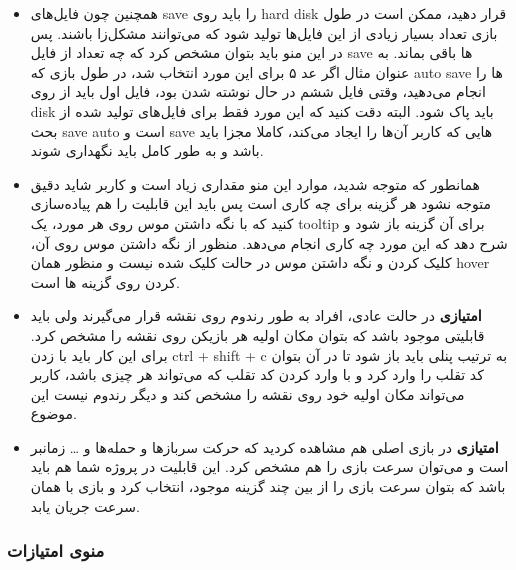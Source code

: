 \documentclass[]{article}
\begin{document}
\begin{itemize}
\item همچنین چون فایل‌های save را باید روی hard disk قرار دهید، ممکن است در طول بازی تعداد بسیار زیادی از این فایل‌ها تولید شود که می‌توانند مشکل‌زا باشند. پس در این منو باید بتوان مشخص کرد که چه تعداد از فایل save ها باقی بماند. به عنوان مثال اگر عد ۵ برای این مورد انتخاب شد، در طول بازی که auto save ها را انجام می‌دهید، وقتی فایل ششم در حال نوشته شدن بود، فایل اول باید از روی disk باید پاک شود. البته دقت کنید که این مورد فقط برای فایل‌های تولید شده از بحث save auto است و save هایی که کاربر آن‌ها را ایجاد می‌کند، کاملا مجزا باید باشد و به طور کامل باید نگهداری شوند.

\item همانطور که متوجه شدید، موارد این منو مقداری زیاد است و کاربر شاید دقیق متوجه نشود هر گزینه برای چه کاری است پس باید این قابلیت را هم پیاده‌سازی کنید که با نگه داشتن موس روی هر مورد، یک tooltip برای آن گزینه باز شود و شرح دهد که این مورد چه کاری انجام می‌دهد. منظور از نگه داشتن موس روی آن، کلیک کردن و نگه داشتن موس در حالت کلیک شده نیست و منظور همان hover کردن روی گزینه ها است.

\item \textbf{امتیازی} در حالت عادی، افراد به طور رندوم روی نقشه قرار می‌گیرند ولی باید قابلیتی موجود باشد که بتوان مکان اولیه هر بازیکن روی نقشه را مشخص کرد. برای این کار باید با زدن ctrl + shift + c به ترتیب پنلی باید باز شود تا در آن بتوان کد تقلب را وارد کرد و با وارد کردن کد تقلب که می‌تواند هر چیزی باشد، کاربر می‌تواند مکان اولیه خود روی نقشه را مشخص کند و دیگر رندوم نیست این موضوع.

\item \textbf{امتیازی} در بازی اصلی هم مشاهده کردید که حرکت سربازها و حمله‌ها و … زمانبر است و می‌توان سرعت بازی را هم مشخص کرد. این قابلیت در پروژه شما هم باید باشد که بتوان سرعت بازی را از بین چند گزینه موجود، انتخاب کرد و بازی با همان سرعت جریان یابد.

\end{itemize}



\subsubsection*{{\titr منوی امتیازات}}
\end{document}
